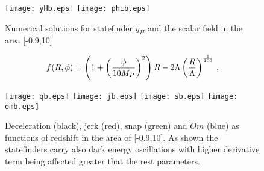 \documentclass[aps,prd,twocolumn,groupedaddress,showpacs,nofootinbib,amssymb]{revtex4-2}
\begin{document}
\begin{figure}[h!]
\centering
\label{plot5}
\texttt{[image: yHb.eps]}
\texttt{[image: phib.eps]}
\caption{Numerical solutions for statefinder $y_H$ and the scalar field in the area [-0.9,10]}
\end{figure}

\begin{equation}
\centering
\label{f2}
f(R,\phi)=\left(1+\left(\frac{\phi}{10M_P}\right)^2\right) R-2\Lambda \left(\frac{R}{\Lambda}\right)^{\frac{1}{100}}\, ,
\end{equation}

\begin{figure}[h!]
\centering
\label{plot6}
\texttt{[image: qb.eps]}
\texttt{[image: jb.eps]}
\texttt{[image: sb.eps]}
\texttt{[image: omb.eps]}
\caption{Deceleration (black), jerk (red), snap (green) and $Om$ (blue) as functions of redshift in the area of [-0.9,10]. As shown the statefinders carry also dark energy oscillations with higher derivative term being affected greater that the rest parameters.}
\end{figure}
\end{document}
